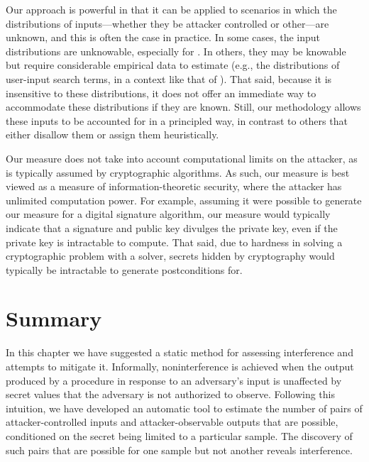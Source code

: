 Our approach is powerful in that it can be applied to scenarios in
which the distributions of inputs---whether they be attacker
controlled or other---are unknown, and this is often the case in
practice.  In some cases, the input distributions are unknowable,
especially for \ACIKeys.  In others, they may be knowable but require
considerable empirical data to estimate (e.g., the distributions of
user-input search terms, in a context like that of
).  That said, because it is
insensitive to these distributions, it does not offer an immediate way
to accommodate these distributions if they are known.  Still, our
methodology allows these inputs to be accounted for in a principled
way, in contrast to others that either disallow them or assign them
heuristically.

Our measure does not take into account computational limits on the
attacker, as is typically assumed by cryptographic algorithms.  As
such, our measure is best viewed as a measure of information-theoretic
security, where the attacker has unlimited computation power.  For
example, assuming it were possible to generate our measure for a
digital signature algorithm, our measure would typically indicate that
a signature and public key divulges the private key, even if the
private key is intractable to compute.  That said, due to hardness in
solving a cryptographic problem with a solver, secrets hidden by
cryptography would typically be intractable to generate postconditions
for.

\section{Summary}
\label{sscf:sec:summary}

In this chapter we have suggested a static method for assessing
interference and attempts to mitigate it.  Informally,
noninterference is achieved when the output produced by a procedure in
response to an adversary's input is unaffected by secret values that
the adversary is not authorized to observe.  Following this intuition,
we have developed an automatic tool to estimate the number of pairs of
attacker-controlled inputs and attacker-observable outputs that are
possible, conditioned on the secret being limited to a particular
sample.  The discovery of such pairs that are possible for one sample
but not another reveals interference.

